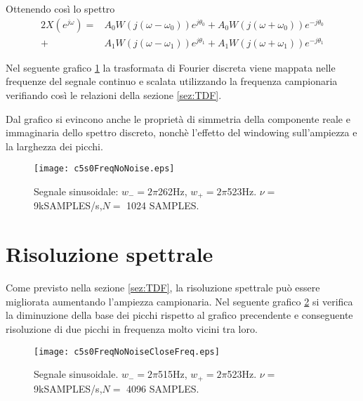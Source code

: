 Ottenendo così lo spettro
\begin{align*}
2X(e^{j\omega}) = 	  &A_{0}W(j(\omega-\omega_{0}))e^{j\theta_{0}} + A_{0}W(j(\omega+\omega_{0}))e^{-j\theta_{0}}  \\
			+ &A_{1}W(j(\omega-\omega_{1}))e^{j\theta_{1}} + A_{1}W(j(\omega+\omega_{1}))e^{-j\theta_{1}}
\end{align*}

Nel seguente grafico \ref{fig:c5s0FreqNoNoise} la trasformata di Fourier discreta viene mappata nelle frequenze del segnale continuo e scalata utilizzando la frequenza campionaria verifiando così le relazioni della sezione \ref{sez:TDF}.

Dal grafico si evincono anche le proprietà di simmetria della componente reale e immaginaria dello spettro discreto, nonchè l'effetto del windowing sull'ampiezza e la larghezza dei picchi.

\begin{figure}%
\centering    
\texttt{[image: c5s0FreqNoNoise.eps]}
\caption[Trasformata discreta di Fourier di un segnale sinusoidale]
{Segnale sinusoidale: $w_{-}=2\pi$262Hz, $w_{+}=2\pi$523Hz.
$\nu=$ 9kSAMPLES/s,$N=$ 1024 SAMPLES.}
\label{fig:c5s0FreqNoNoise}
\end{figure}

\newpage



\section{Risoluzione spettrale}

Come previsto nella sezione \ref{sez:TDF}, la risoluzione spettrale può essere migliorata aumentando l'ampiezza campionaria.
Nel seguente grafico \ref{fig:c5s0FreqNoNoiseCloseFreq} si verifica la diminuzione della base dei picchi rispetto al grafico precendente e conseguente risoluzione di due picchi in frequenza molto vicini tra loro.

\begin{figure}%
\centering    
\texttt{[image: c5s0FreqNoNoiseCloseFreq.eps]}
\caption[Risoluzione spettrale]
{Segnale sinusoidale. $w_{-}=2\pi$515Hz, $w_{+}=2\pi$523Hz. $\nu=$ 9kSAMPLES/s,$N=$ 4096 SAMPLES.}
\label{fig:c5s0FreqNoNoiseCloseFreq}
\end{figure}

\newpage


